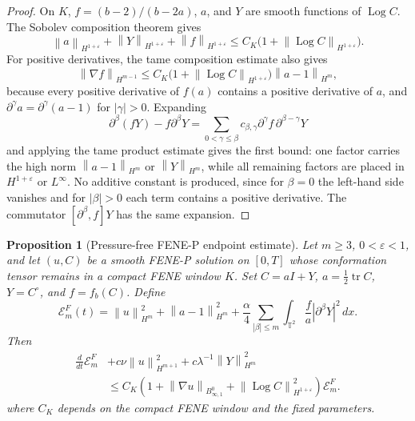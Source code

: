 \documentclass[11pt]{article}
\newtheorem{proposition}{Proposition}[section]
\newcommand{\T}{\mathbb T}
\newcommand{\tr}{\operatorname{tr}}
\newcommand{\Log}{\operatorname{Log}}
\newcommand{\calE}{\mathcal E}
\newcommand{\eps}{\varepsilon}
\newcommand{\norm}[1]{\left\lVert #1\right\rVert}
\newcommand{\Besov}{B^0_{\infty,1}}
\begin{document}
\begin{proof}
On \(K\), \(f=(b-2)/(b-2a)\), \(a\), and \(Y\) are smooth functions of
\(\Log C\).  The Sobolev composition theorem gives
\[
  \norm{a}_{H^{1+\eps}}+\norm{Y}_{H^{1+\eps}}+\norm{f}_{H^{1+\eps}}
  \le C_K\bigl(1+\norm{\Log C}_{H^{1+\eps}}\bigr).
\]
For positive derivatives, the tame composition estimate also gives
\[
  \norm{\nabla f}_{H^{m-1}}
  \le
  C_K\bigl(1+\norm{\Log C}_{H^{1+\eps}}\bigr)\norm{a-1}_{H^m},
\]
because every positive derivative of \(f(a)\) contains a positive derivative
of \(a\), and \(\partial^\gamma a=\partial^\gamma(a-1)\) for
\(|\gamma|>0\).
Expanding
\[
  \partial^\beta(fY)-f\partial^\beta Y
  =
  \sum_{0<\gamma\le\beta}c_{\beta,\gamma}
  \partial^\gamma f\,\partial^{\beta-\gamma}Y
\]
and applying the tame product estimate gives the first bound: one factor
carries the high norm \(\norm{a-1}_{H^m}\) or \(\norm{Y}_{H^m}\), while all
remaining factors are placed in \(H^{1+\eps}\) or \(L^\infty\).  No additive
constant is produced, since for \(\beta=0\) the left-hand side vanishes and for
\(|\beta|>0\) each term contains a positive derivative.  The commutator
\([\partial^\beta,f]Y\) has the same expansion.
\end{proof}

\begin{proposition}[Pressure-free FENE-P endpoint estimate]
\label{prop:fene-high-order-unified}
Let \(m\ge3\), \(0<\eps<1\), and let \((u,C)\) be a smooth FENE-P solution on
\([0,T]\) whose conformation tensor remains in a compact FENE window \(K\).
Set \(C=aI+Y\), \(a=\frac12\tr C\), \(Y=C^\circ\), and \(f=f_b(C)\).  Define
\[
  \calE_m^F(t)=
  \norm{u}_{H^m}^2+\norm{a-1}_{H^m}^2
  +\frac{\alpha}{4}\sum_{|\beta|\le m}
  \int_{\T^2}\frac{f}{a}|\partial^\beta Y|^2\,dx .
\]
Then
\[
\begin{aligned}
  \frac{d}{dt}\calE_m^F
  &+c\nu\norm{u}_{H^{m+1}}^2
    +c\lambda^{-1}\norm{Y}_{H^m}^2  \\
  &\le
  C_K\left(
    1+\norm{\nabla u}_{\Besov}
    +\norm{\Log C}_{H^{1+\eps}}^2
  \right)\calE_m^F .
\end{aligned}
  \label{eq:fene-high-order-unified}
\]
where \(C_K\) depends on the compact FENE window and the fixed parameters.
\end{proposition}
\end{document}

